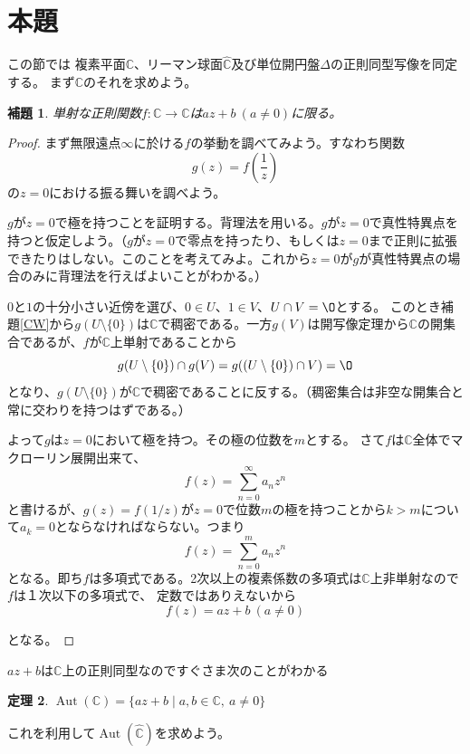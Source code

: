 \documentclass[leqno]{jsarticle}
\newtheorem{thm}{定理}
\newtheorem{lem}[thm]{補題}
\newcommand{\cc}{\mathbb{C}}
\DeclareMathOperator{\aut}{Aut}
\begin{document}
\section{本題}
この節では
複素平面$\cc$、リーマン球面$\hat{\cc}$及び単位開円盤$\Delta$の正則同型写像を同定する。
まず$\cc$のそれを求めよう。
\begin{lem}
単射な正則関数$f:\cc\to \cc$は$az+b\ (a\neq 0)$に限る。
\end{lem}
\begin{proof}
まず無限遠点$\infty$に於ける$f$の挙動を調べてみよう。すなわち関数
\[
g(z)=f\left(\frac{1}{z}\right)
\]
の$z=0$における振る舞いを調べよう。\par
$g$が$z=0$で極を持つことを証明する。背理法を用いる。$g$が$z=0$で真性特異点を持つと仮定しよう。（$g$が$z=0$で零点を持ったり、もしくは$z=0$まで正則に拡張できたりはしない。このことを考えてみよ。これから$z=0$が$g$が真性特異点の場合のみに背理法を行えばよいことがわかる。）\par
$0$と$1$の十分小さい近傍を選び、$0\in U$、$1\in V$、$U\cap V=\O$とする。
このとき補題\ref{CW}から$g(U\setminus \{0\})$は$\cc$で稠密である。一方$g(V)$は開写像定理から$\cc$の開集合であるが、$f$が$\cc$上単射であることから
\[
g(U\setminus \{0\})\cap g(V)=g((U\setminus \{0\})\cap V)=\O
\]
となり、$g(U\setminus \{0\})$が$\cc$で稠密であることに反する。（稠密集合は非空な開集合と常に交わりを持つはずである。）

よって$g$は$z=0$において極を持つ。その極の位数を$m$とする。
さて$f$は$\cc$全体でマクローリン展開出来て、
\[
f(z)=\sum_{n=0}^{\infty}a_nz^n
\]
と書けるが、$g(z)=f(1/z)$が$z=0$で位数$m$の極を持つことから$k>m$について$a_k=0$とならなければならない。つまり
\[
f(z)=\sum_{n=0}^{m}a_nz^n
\]
となる。即ち$f$は多項式である。2次以上の複素係数の多項式は$\cc$上非単射なので$f$は１次以下の多項式で、
定数ではありえないから
\[
f(z)=az+b\ (a\neq 0)
\]

となる。

\end{proof}
$az+b$は$\cc$上の正則同型なのですぐさま次のことがわかる
\begin{thm}
$\aut(\cc)=\{az+b\mid a,b\in \cc,\ a\neq 0\}$
\end{thm}
これを利用して$\aut(\hat{\cc})$を求めよう。
\end{document}
